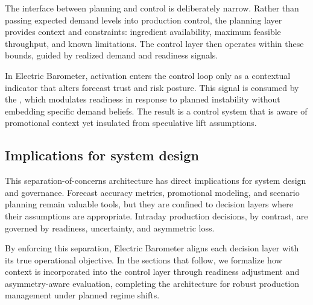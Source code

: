The interface between planning and control is deliberately narrow. Rather than passing expected
\LTO{} demand levels into production control, the planning layer provides context and constraints:
ingredient availability, maximum feasible throughput, and known limitations. The control layer
then operates within these bounds, guided by realized demand and readiness signals.

In Electric Barometer, \LTO{} activation enters the control loop only as a contextual indicator that
alters forecast trust and risk posture. This signal is consumed by the \RAL{}, which modulates
readiness in response to planned instability without embedding specific demand beliefs. The result
is a control system that is aware of promotional context yet insulated from speculative lift
assumptions.

\subsection{Implications for system design}
\label{subsec:separation-implications}

This separation-of-concerns architecture has direct implications for system design and governance.
Forecast accuracy metrics, promotional modeling, and scenario planning remain valuable tools, but
they are confined to decision layers where their assumptions are appropriate. Intraday production
decisions, by contrast, are governed by readiness, uncertainty, and asymmetric loss.

By enforcing this separation, Electric Barometer aligns each decision layer with its true operational
objective. In the sections that follow, we formalize how \LTO{} context is incorporated into the
control layer through readiness adjustment and asymmetry-aware evaluation, completing the
architecture for robust production management under planned regime shifts.

